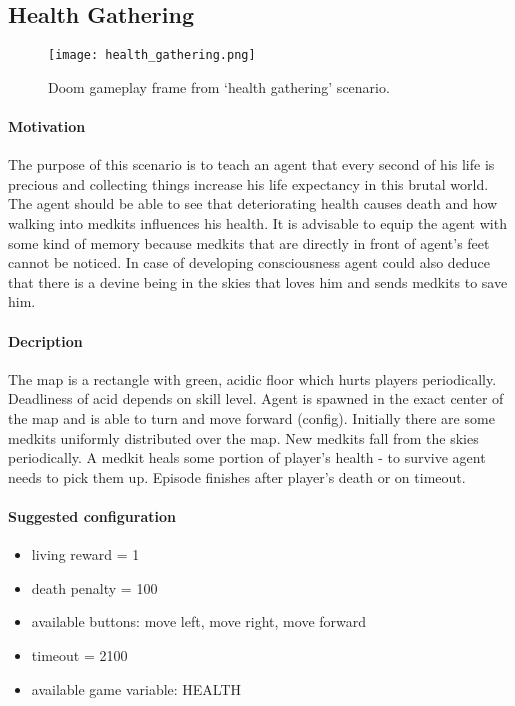 	\subsection{Health Gathering}
		\begin{figure}
			\centering
			\texttt{[image: health\_gathering.png]}
			\caption{Doom gameplay frame from `health gathering' scenario.}\label{fig:health_gathering}
		\end{figure}
		\paragraph{Motivation}
			The purpose of this scenario is to teach an agent that every second of his life is precious and collecting things increase his life expectancy in this brutal world. The agent should be able to see that deteriorating health causes death and how walking into medkits influences his health. It is advisable to equip the agent with some kind of memory because medkits that are directly in front of agent's feet cannot be noticed. In case of developing consciousness agent could also deduce that there is a devine being in the skies that loves him and sends medkits to save him.

		\paragraph{Decription}
			The map is a rectangle with green, acidic floor which hurts players periodically. Deadliness of acid depends on skill level. Agent is spawned in the exact center of the map and is able to turn and move forward (config).  Initially there are some medkits uniformly distributed over the map. New medkits fall from the skies periodically. A medkit heals some portion of player's health - to survive agent needs to pick them up. Episode finishes after player's death or on timeout.

		\paragraph{Suggested configuration}
		\begin{itemize}
			\item living reward = 1
			\item death penalty = 100
			\item available buttons: move left, move right, move forward
			\item timeout = 2100
			\item available game variable: HEALTH
		\end{itemize}
	\newpage


